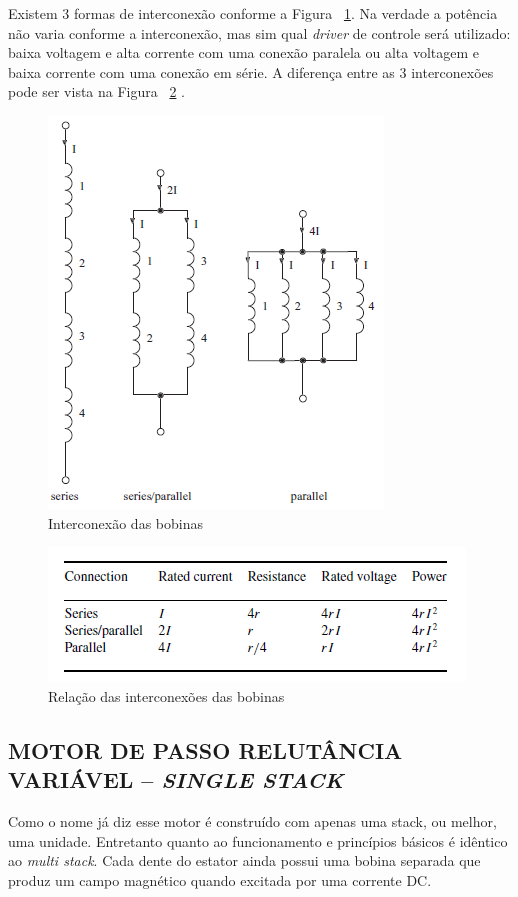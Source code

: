 Existem 3 formas de interconexão conforme a Figura ~\ref{fig:bobinas}. Na verdade a potência não varia conforme a interconexão, mas sim qual \emph{driver} de controle será utilizado: baixa voltagem e alta corrente com uma conexão paralela ou alta voltagem e baixa corrente com uma conexão em série. A diferença entre as 3 interconexões pode ser vista na Figura ~\ref{fig:relacaobobina} \cite{acarnley2002stepping}.

\begin{figure}[htp]
	\centering
	\includegraphics[scale=1]{images/bobinas.png}
	\caption{Interconexão das bobinas}	
	\label{fig:bobinas}	
\end{figure}

\begin{figure}[htp]
	\centering
	\includegraphics[scale=1]{images/relacao_bobina.png}
	\caption{Relação das interconexões das bobinas}	
	\label{fig:relacaobobina}	
\end{figure}

\subsection{MOTOR DE PASSO RELUTÂNCIA VARIÁVEL – \emph{SINGLE STACK}}
Como o nome já diz esse motor é construído com apenas uma stack, ou melhor, uma unidade. Entretanto quanto ao funcionamento e princípios básicos é idêntico ao \emph{multi stack}. Cada dente do estator ainda possui uma bobina separada que produz um campo magnético quando excitada por uma corrente DC.

